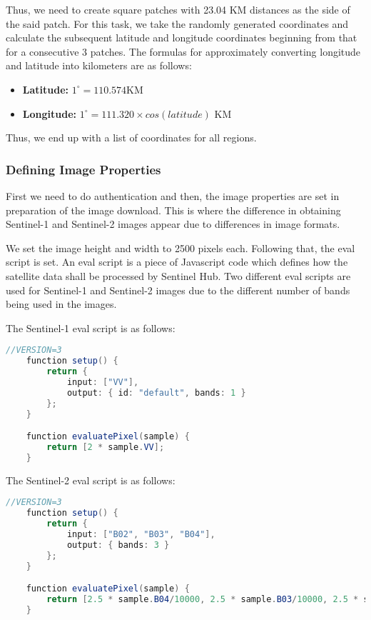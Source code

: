 Thus, we need to create square patches with 23.04 KM distances as the side of the said patch. For this task, we take the randomly generated coordinates and calculate the subsequent latitude and longitude coordinates beginning from that for a consecutive 3 patches. The formulas for approximately converting longitude and latitude into kilometers are as follows:

\begin{itemize}
    \item \textbf{Latitude: } $1^\circ = 110.574$KM
    \item \textbf{Longitude:} $1^\circ = 111.320\times cos(latitude)$ KM
\end{itemize}

Thus, we end up with a list of coordinates for all regions.

\subsubsection{Defining Image Properties}

First we need to do authentication and then, the image properties are set in preparation of the image download. This is where the difference in obtaining Sentinel-1 and Sentinel-2 images appear due to differences in image formats.

We set the image height and width to 2500 pixels each. Following that, the eval script is set. An eval script is a piece of Javascript code which defines how the satellite data shall be processed by Sentinel Hub\cite{evalDoc}. Two different eval scripts are used for Sentinel-1 and Sentinel-2 images due to the different number of bands being used in the images.

The Sentinel-1 eval script is as follows:

\begin{lstlisting}[language=Java]
    //VERSION=3
    function setup() {
        return {
            input: ["VV"],
            output: { id: "default", bands: 1 }
        };
    }

    function evaluatePixel(sample) {
        return [2 * sample.VV];
    }
\end{lstlisting}

The Sentinel-2 eval script is as follows:

\begin{lstlisting}[language=Java]
    //VERSION=3
    function setup() {
        return {
            input: ["B02", "B03", "B04"],
            output: { bands: 3 }
        };
    }

    function evaluatePixel(sample) {
        return [2.5 * sample.B04/10000, 2.5 * sample.B03/10000, 2.5 * sample.B02/10000];
    }
\end{lstlisting}

